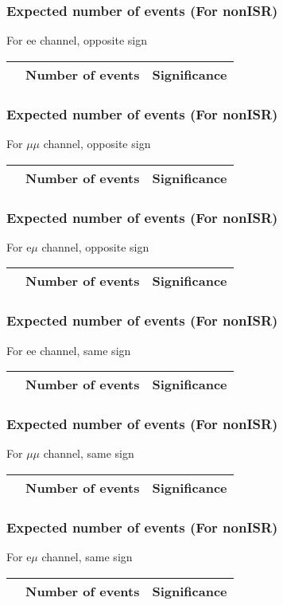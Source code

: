 \begin{frame}
\frametitle{Expected number of events (For nonISR)}
For ee channel, opposite sign \\
\vspace{5mm}
\begin{tabular}{|c|c|c|}
\hline
& Number of events & Significance \\
\hline

\end{tabular}
\end{frame}

\begin{frame}
\frametitle{Expected number of events (For nonISR)}
For $\mu\mu$ channel, opposite sign \\
\vspace{5mm}
\begin{tabular}{|c|c|c|}
\hline
& Number of events & Significance \\
\hline

\end{tabular}
\end{frame}

\begin{frame}
\frametitle{Expected number of events (For nonISR)}
For e$\mu$ channel, opposite sign \\
\vspace{5mm}
\begin{tabular}{|c|c|c|}
\hline
& Number of events & Significance \\
\hline

\end{tabular}
\end{frame}

\begin{frame}
\frametitle{Expected number of events (For nonISR)}
For ee channel, same sign \\
\vspace{5mm}
\begin{tabular}{|c|c|c|}
\hline
& Number of events & Significance \\
\hline

\end{tabular}
\end{frame}

\begin{frame}
\frametitle{Expected number of events (For nonISR)}
For $\mu\mu$ channel, same sign \\
\vspace{5mm}
\begin{tabular}{|c|c|c|}
\hline
& Number of events & Significance \\
\hline

\end{tabular}
\end{frame}

\begin{frame}
\frametitle{Expected number of events (For nonISR)}
For e$\mu$ channel, same sign \\
\vspace{5mm}
\begin{tabular}{|c|c|c|}
\hline
& Number of events & Significance \\
\hline

\end{tabular}
\end{frame}

